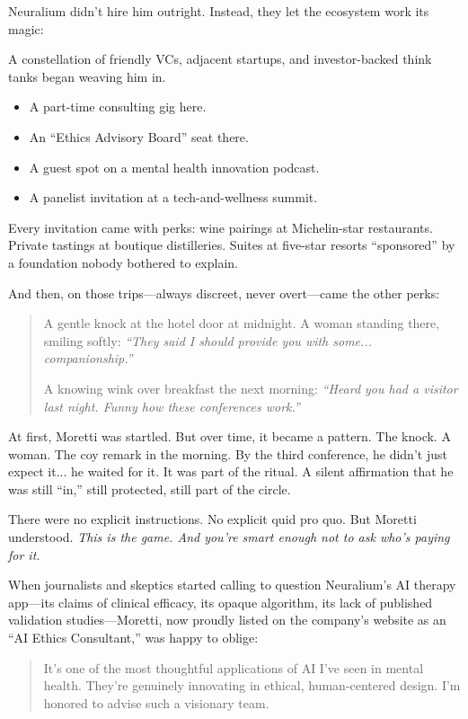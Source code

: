 Neuralium didn’t hire him outright. Instead, they let the ecosystem work its magic:  

A constellation of friendly VCs, adjacent startups, and investor-backed think tanks began weaving him in.

\begin{itemize}
  \item A part-time consulting gig here.
  \item An ``Ethics Advisory Board'' seat there.
  \item A guest spot on a mental health innovation podcast.
  \item A panelist invitation at a tech-and-wellness summit.
\end{itemize}

Every invitation came with perks: wine pairings at Michelin-star restaurants. Private tastings at boutique 
distilleries. Suites at five-star resorts ``sponsored'' by a foundation nobody bothered to explain.

And then, on those trips—always discreet, never overt—came the other perks:

\begin{quote}
A gentle knock at the hotel door at midnight.  
A woman standing there, smiling softly: \textit{``They said I should provide you with some... companionship.''}

A knowing wink over breakfast the next morning:  
\textit{``Heard you had a visitor last night. Funny how these conferences work.''}
\end{quote}

At first, Moretti was startled. But over time, it became a pattern. The knock. A woman. The coy remark in the morning.  
By the third conference, he didn’t just expect it... he waited for it.  
It was part of the ritual. A silent affirmation that he was still ``in,'' still protected, still part of the circle.

There were no explicit instructions. No explicit quid pro quo. But Moretti understood.  
\textit{This is the game. And you’re smart enough not to ask who’s paying for it.}

When journalists and skeptics started calling to question Neuralium’s AI therapy app—its claims of clinical efficacy, 
its opaque algorithm, its lack of published validation studies—Moretti, now proudly listed on the company’s website 
as an ``AI Ethics Consultant,'' was happy to oblige:

\begin{quote}
It’s one of the most thoughtful applications of AI I’ve seen in mental health. They’re genuinely innovating in 
ethical, human-centered design. I’m honored to advise such a visionary team.
\end{quote}

